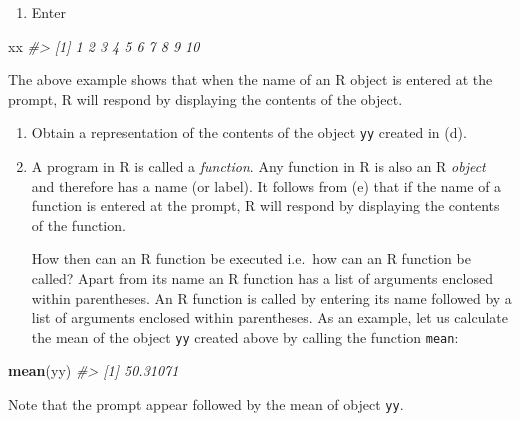 \documentclass[
]{book}
\newenvironment{Shaded}{\begin{snugshade}}{\end{snugshade}}
\newcommand{\CommentTok}[1]{\textcolor[rgb]{0.56,0.35,0.01}{\textit{#1}}}
\newcommand{\FunctionTok}[1]{\textcolor[rgb]{0.13,0.29,0.53}{\textbf{#1}}}
\newcommand{\NormalTok}[1]{#1}
\providecommand{\tightlist}{%
  \setlength{\itemsep}{0pt}\setlength{\parskip}{0pt}}
\begin{document}
\begin{enumerate}
\def\labelenumi{(\alph{enumi})}
\setcounter{enumi}{4}
\tightlist
\item
  Enter
\end{enumerate}

\begin{Shaded}
\begin{Highlighting}[]
\NormalTok{xx}
\CommentTok{\#\textgreater{}  [1]  1  2  3  4  5  6  7  8  9 10}
\end{Highlighting}
\end{Shaded}

The above example shows that {when the name of an R object is entered at the prompt, R will respond by displaying the contents of the object}.

\begin{enumerate}
\def\labelenumi{(\alph{enumi})}
\setcounter{enumi}{5}
\item
  Obtain a representation of the contents of the object \texttt{yy} created in (d).
\item
  A program in R is called a \emph{{function}}. Any function in R is also an R \emph{{object}} and therefore has a name (or label). It follows from (e) that if the name of a function is entered at the prompt, R will respond by displaying the contents of the function.

  How then can an R function be executed i.e.~how can an R function be called? Apart from its name an R function has a list of arguments enclosed within parentheses. An R function is called by entering its name followed by a list of arguments enclosed within parentheses. As an example, let us calculate the mean of the object \texttt{yy} created above by calling the function \texttt{mean}:
\end{enumerate}

\begin{Shaded}
\begin{Highlighting}[]
\FunctionTok{mean}\NormalTok{(yy) }
\CommentTok{\#\textgreater{} [1] 50.31071}
\end{Highlighting}
\end{Shaded}

Note that the prompt appear followed by the mean of object \texttt{yy}.
\end{document}
